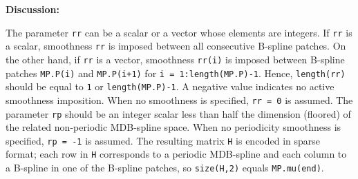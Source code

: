 \documentclass[10pt]{./acmtrans2e}
\newenvironment{remark}
{\vspace*{0.1cm}
\noindent \textbf{Discussion:} \medskip

}
{
\vspace*{0.2cm}
}
\begin{document}
\begin{remark}
\noindent The parameter \texttt{rr} can be a scalar or a vector whose elements are integers.
If \texttt{rr} is a scalar, smoothness \texttt{rr} is imposed between all consecutive B-spline patches.
On the other hand, if \texttt{rr} is a vector, smoothness \texttt{rr(i)} is imposed between B-spline patches \texttt{MP.P(i)} and \texttt{MP.P(i+1)} for \texttt{i = 1:length(MP.P)-1}.
Hence, \texttt{length(rr)} should be equal to \texttt{1} or \texttt{length(MP.P)-1}. 
A negative value indicates no active smoothness imposition.
When no smoothness is specified, \texttt{rr = 0} is assumed. 
The parameter \texttt{rp} should be an integer scalar less than half the dimension (floored) of the related non-periodic MDB-spline space. When no periodicity smoothness is specified, \texttt{rp = -1} is assumed. 
The resulting matrix \texttt{H} is encoded in sparse format;
each row in \texttt{H} corresponds to a periodic MDB-spline and each column to a B-spline in one of the B-spline patches, so \texttt{size(H,2)} equals \texttt{MP.mu(end)}.
\end{remark}
\end{document}
